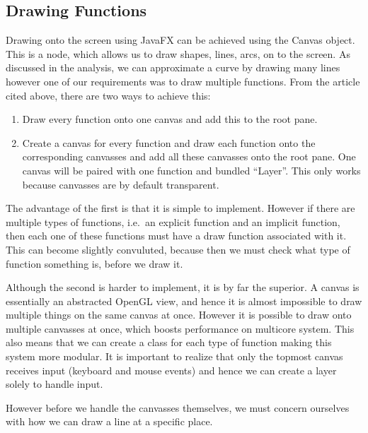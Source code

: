 \documentclass[../../../../../main.tex]{subfiles}
\begin{document}
\subsection{Drawing Functions}
Drawing onto the screen using JavaFX can be achieved using the Canvas\cite{canvas} object. This is a node, which allows us to draw shapes, lines, arcs, on to the screen. As discussed in the analysis, we can approximate a curve by drawing many lines however one of our requirements was to draw multiple functions. From the article cited above, there are two ways to achieve this:
\begin{enumerate}
	\item Draw every function onto one canvas and add this to the root pane.
	\item Create a canvas for every function and draw each function onto the corresponding canvasses and add all these canvasses onto the root pane. One canvas will be paired with one function and bundled ``Layer''. This only works because canvasses are by default transparent.
\end{enumerate}
The advantage of the first is that it is simple to implement. However if there are multiple types of functions, i.e.\ an explicit function and an implicit function, then each one of these functions must have a draw function associated with it. This can become slightly convuluted, because then we must check what type of function something is, before we draw it.

Although the second is harder to implement, it is by far the superior. A canvas is essentially an abstracted OpenGL view, and hence it is almost impossible\cite{openglMultithread} to draw multiple things on the same canvas at once. However it is possible to draw onto multiple canvasses at once, which boosts performance on multicore system. This also means that we can create a class for each type of function making this system more modular. It is important to realize that only the topmost canvas receives input (keyboard and mouse events) and hence we can create a layer solely to handle input.

However before we handle the canvasses themselves, we must concern ourselves with how we can draw a line at a specific place.
\newpage 
\end{document}
